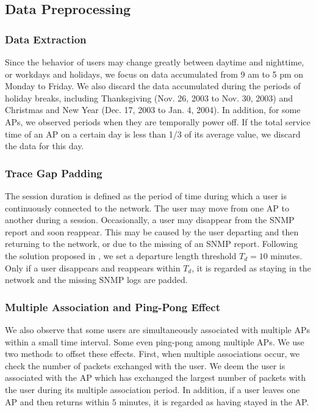 \subsection{Data Preprocessing} \label{sec:preproc}
\subsubsection{Data Extraction}
Since the behavior of users may change greatly between daytime and nighttime, or workdays and holidays, we focus on data accumulated from 9 am to 5 pm on Monday to Friday. We also discard the data accumulated during the periods of holiday breaks, including Thanksgiving (Nov. 26, 2003 to Nov. 30, 2003) and Christmas and New Year (Dec. 17, 2003 to Jan. 4, 2004).
In addition, for some APs, we observed periods when they are temporally power off.  If the total service time of an AP on a certain day is less than 1/3 of its average value, we discard the data for this day.



\subsubsection{Trace Gap Padding}
The session duration is defined as the period of time during which a user is continuously connected to the network. The user may move from one AP to another during a session. Occasionally, a user may disappear from the SNMP report and soon reappear. This may be caused by the user departing and then returning to the network, or due to the missing of an SNMP report. Following the solution proposed in \cite{Mobility-Core1}, we set a departure length threshold $T_d=10$ minutes. Only if a user disappears and reappears within $T_d$, it is regarded as staying in the network and the missing SNMP logs are padded.

\subsubsection{Multiple Association and Ping-Pong Effect}
We also observe that some users are simultaneously associated with multiple APs within a small time interval.  Some even ping-pong among multiple APs.  We use two methods to offset these effects. First, when multiple associations occur, we check the number of packets exchanged with the user. We deem the user is associated with the AP which has exchanged the largest number of packets with the user during its multiple association period.  In addition, if a user leaves one AP and then returns within $5$ minutes, it is regarded as having stayed in the AP.

